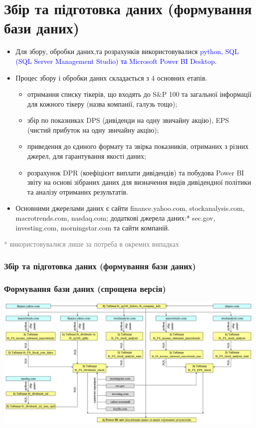\documentclass[aspectratio=169]{beamer}
\begin{document}
\section{Збір та підготовка даних (формування бази даних)}
\begin{frame}
\begin{itemize}
\item Для збору, обробки даних,та розрахунків використовувалися \textcolor{blue} {python, SQL (SQL Server Management Studio) та Microsoft Power BI Desktop}.
\bigskip
\item \alert {Процес збору і обробки даних} складається з 4 основних етапів.
\begin{itemize}
    \item[\textcolor{orange}{\textbullet}] отримання списку тікерів, що входять до S&P 100 та загальної інформації для кожного тікеру (назва компанії, галузь тощо);
    \item[\textcolor{orange}{\textbullet}] збір по показниках DPS (дивіденди на одну звичайну акцію), EPS (чистий прибуток на одну звичайну акцію);
    \item[\textcolor{orange}{\textbullet}] приведення до єдиного формату та звірка показників, отриманих з різних джерел, для гарантування якості даних;
    \item[\textcolor{orange}{\textbullet}] розрахунок DPR (коефіцієнт виплати дивідендів) та побудова Power BI звіту на основі зібраних даних для визначення видів дивідендної політики та аналізу отриманих результатів.
\end{itemize}
\bigskip
\item \alert {Основними джерелами даних} є сайти finance.yahoo.com, stockanalysis.com, macrotrends.com, nasdaq.com; додаткові джерела даних:* sec.gov, investing.com, morningstar.com та сайти компаній.
\end{itemize}
\bigskip
\scriptsize \textcolor{gray}{* використовувалися лише за потреба в окремих випадках} 
\frametitle{Збір та підготовка даних (формування бази даних)}

\end{frame}

\begin{frame}
\frametitle{Формування бази даних (спрощена версія)}
\begin{center}
\includegraphics[scale=0.35]{Data Flow full.png}
\end{center}
\end{frame}
\end{document}

